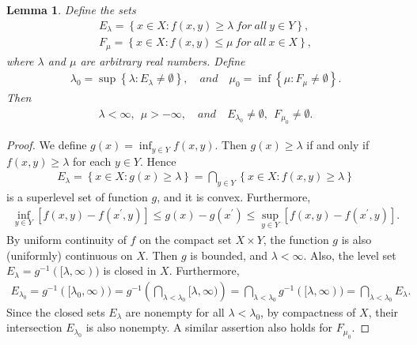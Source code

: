 \documentclass{article}
\numberwithin{equation}{section}
\newtheorem{lemma}[theorem]{Lemma}
\begin{document}
\begin{lemma}\label{nonempty}
Define the sets
\begin{align*}
	E_\lambda=\left\{x\in X:f(x,y)\geq\lambda\ for\ all\ y\in Y\right\},\\
	F_\mu=\left\{x\in X:f(x,y)\leq\mu\ for\ all\ x\in X\right\},
\end{align*}
where $\lambda$ and $\mu$ are arbitrary real numbers. Define
\begin{align*}
	\lambda_0=\sup\left\{\lambda:E_\lambda\neq\emptyset\right\},\quad and\quad \mu_0=\inf\left\{\mu:F_\mu\neq\emptyset\right\}.
\end{align*}
Then
\begin{align*}
	\lambda<\infty,\ \ \mu>-\infty,\quad and\quad E_{\lambda_0}\neq\emptyset,\ \ F_{\mu_0}\neq\emptyset.
\end{align*}
\end{lemma}
\begin{proof}
We define $g(x)=\inf_{y\in Y}f(x,y)$. Then $g(x)\geq\lambda$ if and only if $f(x,y)\geq\lambda$ for each $y\in Y$. Hence
\begin{align*}
	E_\lambda=\left\{x\in X:g(x)\geq\lambda\right\}=\bigcap_{y\in Y}\left\{x\in X:f(x,y)\geq\lambda\right\}
\end{align*}
is a superlevel set of function $g$, and it is convex. Furthermore,
\begin{align*}
	\inf_{y\in Y}\left[f(x,y)-f(x^\prime,y)\right]\leq g(x)-g(x^\prime)\leq\sup_{y\in Y}\left[f(x,y)-f(x^\prime,y)\right].
\end{align*}
By uniform continuity of $f$ on the compact set $X\times Y$, the function $g$ is also (uniformly) continuous on $X$. Then $g$ is bounded, and $\lambda<\infty$. Also, the level set $E_\lambda=g^{-1}([\lambda,\infty))$ is closed in $X$. Furthermore,
\begin{align*}
	E_{\lambda_0}=g^{-1}([\lambda_0,\infty))=g^{-1}\left(\bigcap_{\lambda<\lambda_0}[\lambda,\infty)\right)=\bigcap_{\lambda<\lambda_0}g^{-1}([\lambda,\infty))=\bigcap_{\lambda<\lambda_0} E_\lambda.
\end{align*}
Since the closed sets $E_\lambda$ are nonempty for all $\lambda<\lambda_0$, by compactness of $X$, their intersection $E_{\lambda_0}$ is also nonempty. A similar assertion also holds for $F_{\mu_0}$. 
\end{proof}
\end{document}
